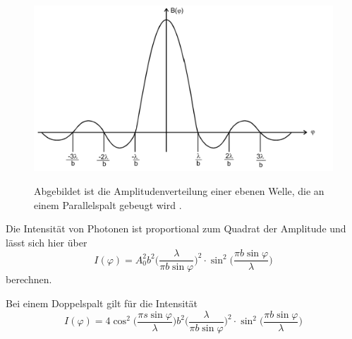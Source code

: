  \begin{figure}[H]
    \centering
    \caption{Abgebildet ist die Amplitudenverteilung einer ebenen Welle, die an einem Parallelspalt gebeugt wird \cite{V406}.}
    \includegraphics{Bilder/Amplitude.png}
    \label{eqn:Amplitude}
\end{figure}

\noindent Die Intensität von Photonen ist proportional zum Quadrat der Amplitude und lässt sich hier über 
\begin{equation}
    I(\varphi)=A_0^2 b^2 \biggl( \frac{\lambda}{\pi b \sin \varphi}\biggr)^2 \cdot \sin^2 \biggl( \frac{\pi b \sin \varphi}{\lambda}\biggr)
    \label{eqn:Intensität}
\end{equation}
berechnen.

\noindent Bei einem Doppelspalt gilt für die Intensität
\begin{equation}
    I(\varphi)=4 \cos^2 \biggl( \frac{\pi s \sin \varphi }{\lambda} \biggr) b^2 \biggl( \frac{\lambda}{\pi b \sin \varphi}\biggr)^2 \cdot \sin^2 \biggl( \frac{\pi b \sin \varphi}{\lambda}\biggr)
    \label{eqn:Intensität2}
\end{equation}

\cite{V406}